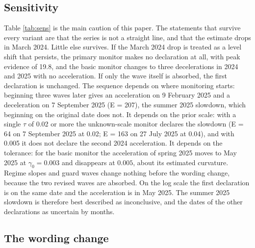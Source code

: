 \documentclass[Afour,sageh,times]{sagej}
\theoremstyle{definition}
\begin{document}
\subsection{Sensitivity}
\label{sec:sensitivity}

\begin{table}[t]
\small\centering
\caption{Declarations under variants of the monitor on the national series. Dec.: deceleration; acc.: acceleration. For the epochs that end without a declaration the maximum E in the last epoch is given.}
\label{tab:sens}

\end{table}

Table \ref{tab:sens} is the main caution of this paper. The statements that survive every variant are that the series is not a straight line, and that the estimate drops in March 2024. Little else survives. If the March 2024 drop is treated as a level shift that persists, the primary monitor makes no declaration at all, with peak evidence of 19.8, and the basic monitor changes to three decelerations in 2024 and 2025 with no acceleration. If only the wave itself is absorbed, the first declaration is unchanged. The sequence depends on where monitoring starts: beginning three waves later gives an acceleration on 9 February 2025 and a deceleration on 7 September 2025 (E = 207), the summer 2025 slowdown, which beginning on the original date does not. It depends on the prior scale: with a single $\tau$ of 0.02 or more the unknown-scale monitor declares the slowdown (E = 64 on 7 September 2025 at 0.02; E = 163 on 27 July 2025 at 0.04), and with 0.005 it does not declare the second 2024 acceleration. It depends on the tolerance: for the basic monitor the acceleration of spring 2025 moves to May 2025 at $\gamma_0 = 0.003$ and disappears at $0.005$, about its estimated curvature. Regime slopes and guard waves change nothing before the wording change, because the two revised waves are absorbed. On the log scale the first declaration is on the same date and the acceleration is in May 2025. The summer 2025 slowdown is therefore best described as inconclusive, and the dates of the other declarations as uncertain by months.

\subsection{The wording change}
\label{sec:break}

\begin{table}[t]
\small\centering
\caption{Employment size classes at the wording change. Ratio is the first revised estimate over the last legacy estimate; jump is the standardized change; the 95th percentile is that of the class's standardized wave-to-wave changes within the legacy regime. The last column gives the date on which the pooled basic monitor declares an acceleration at the wording change, where it does.}
\label{tab:strata}

\end{table}
\end{document}
